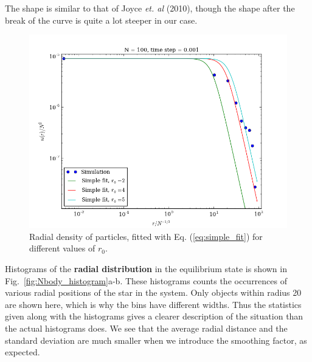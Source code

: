 \documentclass{article}
\begin{document}
\begin{multicols}{2}
The shape is similar to that of Joyce \textit{et. al} (2010), though the shape after the break of the curve is quite a lot steeper in our case. 

\begin{figure}
\begin{center}
  	\includegraphics[width=120mm]{Images/radial_distribution_temp.png}
\caption{Radial density of particles, fitted with Eq. (\ref{eq:simple_fit}) for different values of $r_0$.}\label{fig:Nbody_radial_dist}
\end{center}
\end{figure}
Histograms of the \textbf{radial distribution} in the equilibrium state is shown in Fig.~\ref{fig:Nbody_histogram}a-b. These histograms counts the occurrences of various radial positions of the star in the system. Only objects within radius 20 are shown here, which is why the bins have different widths. Thus the statistics given along with the histograms gives a clearer description of the situation than the actual histograms does. We see that the average radial distance and the standard deviation are much smaller when we introduce the smoothing factor, as expected. 


\end{multicols}
\end{document}
